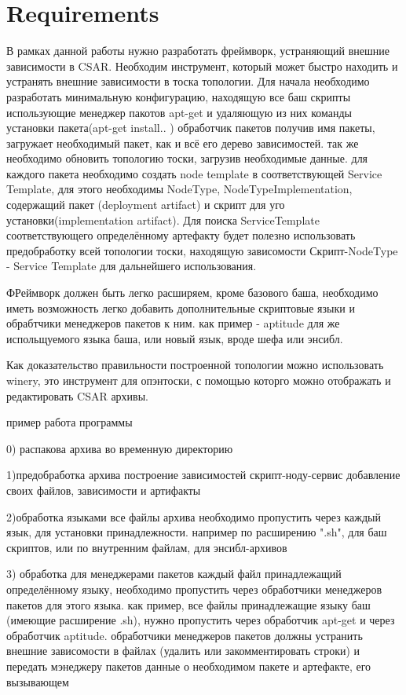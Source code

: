 
\chapter{Requirements}
\label{chap:req}


В рамках данной работы нужно разработать фреймворк, устраняющий внешние зависимости в CSAR. 
Необходим инструмент, который может быстро находить и устранять внешние зависимости в тоска топологии. 
Для начала необходимо разработать минимальную конфигурацию, находящую все баш скрипты использующие менеджер пакотов apt-get и удаляющую из них команды установки пакета(apt-get install.. )
обработчик пакетов получив имя пакеты, загружает необходимый пакет, как и всё его дерево зависимостей. так же необходимо обновить топологию тоски, загрузив необходимые данные. 
для каждого пакета необходимо создать node template в соответствующей Service Template, для этого необходимы NodeType, NodeTypeImplementation, содержащий пакет (deployment artifact) и скрипт для уго установки(implementation artifact). 
Для поиска ServiceTemplate соответствующего определённому артефакту будет полезно использовать предобработку всей топологии тоски, находящую зависомости Скрипт-NodeType - Service Template для дальнейшего использования.

ФРеймворк должен быть легко расширяем, кроме базового баша, необходимо иметь возможность легко добавить дополнительные скриптовые языки и обрабтчики менеджеров пакетов к ним. как пример - aptitude для же испольщуемого языка баша, или новый язык, вроде шефа или энсибл.

Как доказательство правильности построенной топологии можно использовать winery, 
это инструмент для опэнтоски, с помощью которго можно отображать и редактировать CSAR архивы.

пример работа программы

0) распакова архива во временную директорию

1)предобработка архива
построение зависимостей скрипт-ноду-сервис
добавление своих файлов, зависимости и артифакты

2)обработка языками
все файлы архива необходимо пропустить через каждый язык, для установки принадлежности. например по расширению ".sh", для баш скриптов, или по внутренним файлам, для энсибл-архивов 

3) обработка для менеджерами пакетов
каждый файл принадлежащий определённому языку, необходимо пропустить через обработчики менеджеров пакетов для этого языка. 
как пример, все файлы принадлежащие языку баш (имеющие расширение .sh), нужно пропустить через обработчик apt-get и через обработчик aptitude.
обработчики менеджеров пакетов должны устранить внешние зависомости в файлах (удалить или закомментировать строки) и передать мэнеджеру пакетов данные о необходимом пакете и артефакте, его вызывающем


